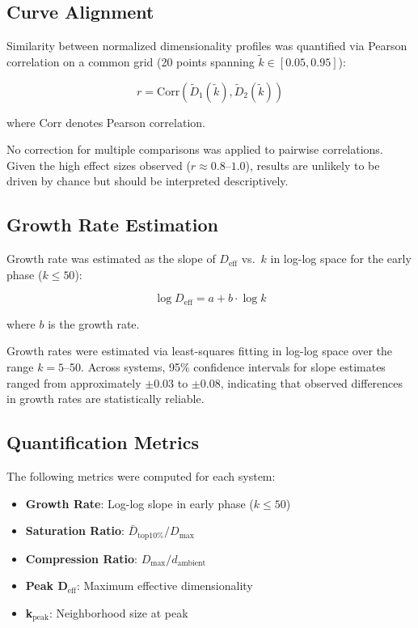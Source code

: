 \subsection{Curve Alignment}

Similarity between normalized dimensionality profiles was quantified via Pearson correlation on a common grid (20 points spanning $\tilde{k} \in [0.05, 0.95]$):

\begin{equation}
	r = \text{Corr}\left(\tilde{D}_1(\tilde{k}), \tilde{D}_2(\tilde{k})\right)
\end{equation}

where Corr denotes Pearson correlation.

No correction for multiple comparisons was applied to pairwise correlations. Given the high effect sizes observed ($r \approx 0.8$--$1.0$), results are unlikely to be driven by chance but should be interpreted descriptively.

\subsection{Growth Rate Estimation}

Growth rate was estimated as the slope of $D_{\mathrm{eff}}$ vs.\ $k$ in log-log space for the early phase ($k \leq 50$):

\begin{equation}
	\log D_{\mathrm{eff}} = a + b \cdot \log k
\end{equation}

where $b$ is the growth rate.

Growth rates were estimated via least-squares fitting in log-log space over the range $k = 5$--50. Across systems, 95\% confidence intervals for slope estimates ranged from approximately $\pm0.03$ to $\pm0.08$, indicating that observed differences in growth rates are statistically reliable.

\subsection{Quantification Metrics}

The following metrics were computed for each system:

\begin{itemize}
	\item \textbf{Growth Rate}: Log-log slope in early phase ($k \leq 50$)
	\item \textbf{Saturation Ratio}: $\bar{D}_{\text{top10\%}} / D_{\max}$
	\item \textbf{Compression Ratio}: $D_{\max} / d_{\text{ambient}}$
	\item \textbf{Peak D$_{\text{eff}}$}: Maximum effective dimensionality
	\item \textbf{k$_{\text{peak}}$}: Neighborhood size at peak
\end{itemize}


